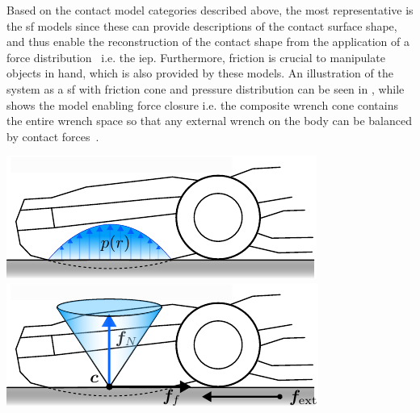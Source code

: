 Based on the contact model categories described above, the most representative is the \gls{sf} models since these can provide descriptions of the contact surface shape, and thus enable the reconstruction of the contact shape from the application of a force distribution~\cite{contact-mechanics} i.e. the \gls{iep}. Furthermore, friction is crucial to manipulate objects in hand, which is also provided by these models. An illustration of the system as a \gls{sf} with friction cone and pressure distribution can be seen in , while  shows the model enabling force closure i.e. the composite wrench cone contains the entire wrench space so that any external wrench  on the body can be balanced by contact forces~\cite{modern-robotics-mechanics-planning-and-control}.
%
\begin{center}
    \renewcommand{\arraystretch}{1.2}
    \begin{minipage}{.48\linewidth}
        \vspace{0pt}
        \centering
        \includegraphics[width=.95\textwidth]{chapters/modeling/fig/contact-surface.pdf}%
        \vspace{0.6cm}
        \includegraphics[width=.95\textwidth]{chapters/modeling/fig/friction-cone-schematic-crop.pdf}%
    \end{minipage}%
    \hfill%
    \begin{minipage}{.48\linewidth}
        \vspace{0pt}
        \centering

\end{minipage}
\end{center}
